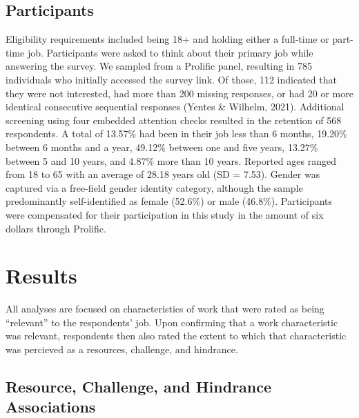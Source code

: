 \documentclass[
  man]{apa6}
\begin{document}
\hypertarget{participants}{%
\subsection{Participants}\label{participants}}

Eligibility requirements included being 18+ and holding either a full-time or part-time job. Participants were asked to think about their primary job while answering the survey. We sampled from a Prolific panel, resulting in 785 individuals who initially accessed the survey link. Of those, 112 indicated that they were not interested, had more than 200 missing responses, or had 20 or more identical consecutive sequential responses (Yentes \& Wilhelm, 2021). Additional screening using four embedded attention checks resulted in the retention of 568 respondents. A total of 13.57\% had been in their job less than 6 months, 19.20\% between 6 months and a year, 49.12\% between one and five years, 13.27\% between 5 and 10 years, and 4.87\% more than 10 years. Reported ages ranged from 18 to 65 with an average of 28.18 years old (SD = 7.53). Gender was captured via a free-field gender identity category, although the sample predominantly self-identified as female (52.6\%) or male (46.8\%). Participants were compensated for their participation in this study in the amount of six dollars through Prolific.

\hypertarget{results}{%
\section{Results}\label{results}}

All analyses are focused on characteristics of work that were rated as being ``relevant'' to the respondents' job. Upon confirming that a work characteristic was relevant, respondents then also rated the extent to which that characteristic was percieved as a resources, challenge, and hindrance.

\hypertarget{resource-challenge-and-hindrance-associations}{%
\subsection{Resource, Challenge, and Hindrance Associations}\label{resource-challenge-and-hindrance-associations}}
\end{document}
